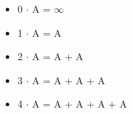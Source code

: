 \begin{itemize}
    \item[] 0 $\cdot$ A = $\infty$
    \item[] 1 $\cdot$ A = A
    \item[] 2 $\cdot$ A = A + A
    \item[] 3 $\cdot$ A = A + A + A
    \item[] 4 $\cdot$ A = A + A + A + A
\end{itemize}

